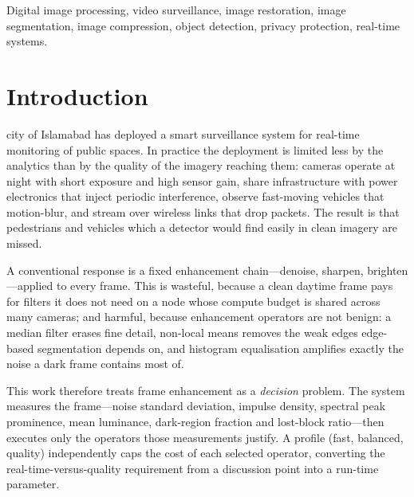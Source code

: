 \documentclass[conference,10pt]{IEEEtran}
\begin{document}
\begin{IEEEkeywords}
Digital image processing, video surveillance, image restoration, image
segmentation, image compression, object detection, privacy protection,
real-time systems.
\end{IEEEkeywords}

\section{Introduction}\label{sec:intro}
 city of Islamabad has deployed a smart surveillance system
for real-time monitoring of public spaces. In practice the deployment is
limited less by the analytics than by the quality of the imagery reaching them:
cameras operate at night with short exposure and high sensor gain, share
infrastructure with power electronics that inject periodic interference,
observe fast-moving vehicles that motion-blur, and stream over wireless links
that drop packets. The result is that pedestrians and vehicles which a detector
would find easily in clean imagery are missed.

A conventional response is a fixed enhancement chain---denoise, sharpen,
brighten---applied to every frame. This is wasteful, because a clean daytime
frame pays for filters it does not need on a node whose compute budget is
shared across many cameras; and harmful, because enhancement operators are not
benign: a median filter erases fine detail, non-local means removes the weak
edges edge-based segmentation depends on, and histogram equalisation amplifies
exactly the noise a dark frame contains most of.

This work therefore treats frame enhancement as a \emph{decision} problem. The
system measures the frame---noise standard deviation, impulse density, spectral
peak prominence, mean luminance, dark-region fraction and lost-block
ratio---then executes only the operators those measurements justify. A profile
(\textsf{fast}, \textsf{balanced}, \textsf{quality}) independently caps the cost
of each selected operator, converting the real-time-versus-quality requirement
from a discussion point into a run-time parameter.
\end{document}
